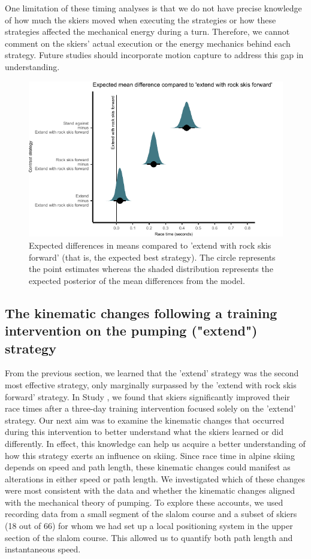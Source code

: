 One limitation of these timing analyses is that we do not have precise knowledge of how much the skiers moved when executing the strategies or how these strategies affected the mechanical energy during a turn. Therefore, we cannot comment on the skiers' actual execution or the energy mechanics behind each strategy. Future studies should incorporate motion capture to address this gap in understanding.


\begin{figure}[H]
\centering
\includegraphics{figure/figure_results_Q1_strategies_2.pdf}
\caption{Expected differences in means compared to 'extend with rock skis forward' (that is, the expected best strategy). The circle represents the point estimates whereas the shaded distribution represents the expected posterior of the mean differences from the model.}
\label{fig:q1_strategieseffect}
\end{figure}



\subsection{The kinematic changes following a training intervention on the pumping ("extend") strategy}
From the previous section, we learned that the 'extend' strategy was the second most effective strategy, only marginally surpassed by the 'extend with rock skis forward' strategy. In Study , we found that skiers significantly improved their race times after a three-day training intervention focused solely on the 'extend' strategy. Our next aim was to examine the kinematic changes that occurred during this intervention to better understand what the skiers learned or did differently. In effect, this knowledge can help us acquire a better understanding of how this strategy exerts an influence on skiing. Since race time in alpine skiing depends on speed and path length, these kinematic changes could manifest as alterations in either speed or path length. We investigated which of these changes were most consistent with the data and whether the kinematic changes aligned with the mechanical theory of pumping. To explore these accounts, we used recording data from a small segment of the slalom course and a subset of skiers (18 out of 66) for whom we had set up a local positioning system in the upper section of the slalom course. This allowed us to quantify both path length and instantaneous speed.

